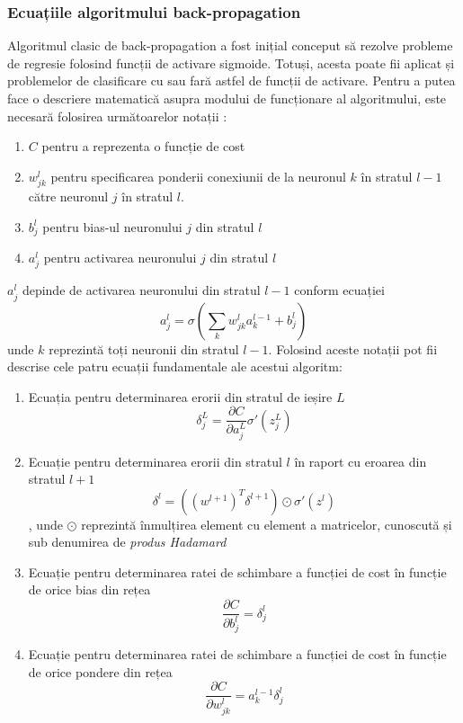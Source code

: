 \subsubsection*{Ecuațiile algoritmului back-propagation}
Algoritmul clasic de back-propagation a fost inițial conceput să rezolve probleme de regresie folosind funcții de activare sigmoide. Totuși, acesta poate fii aplicat și problemelor de clasificare cu sau fară astfel de funcții de activare. Pentru a putea face o descriere matematică asupra modului de funcționare al algoritmului, este necesară folosirea următoarelor notații \cite{neuralnetbook:2015}:
\begin{enumerate}
\item $C$ pentru a reprezenta o funcție de cost
\item $w_{jk}^l$ pentru specificarea ponderii conexiunii de la neuronul $k$ în stratul $l-1$ către neuronul $j$ în stratul $l$.
\item $b_j^l$ pentru bias-ul neuronului $j$ din stratul $l$
\item $a_j^l$ pentru activarea neuronului $j$ din stratul $l$
\end{enumerate}
$a_j^l$ depinde de activarea neuronului din stratul $l-1$ conform ecuației
\begin{equation}
a_j^l=\sigma(\sum_k w_{jk}^l a_k^{l-1} + b_j^l)
\end{equation}
unde $k$ reprezintă toți neuronii din stratul $l-1$. Folosind aceste notații pot fii descrise cele patru ecuații fundamentale ale acestui algoritm:
\begin{enumerate}
\item Ecuația pentru determinarea erorii din stratul de ieșire $L$
\begin{equation}
\delta_j^L=\frac{\partial C}{\partial a_j^L}\sigma'(z_j^L)
\label{eq:out-err}
\end{equation}
\item Ecuație pentru determinarea erorii din stratul $l$ în raport cu eroarea din stratul $l+1$
\begin{equation}
\delta^l = ((w^{l+1})^T \delta^{l+1}) \odot \sigma'(z^l)
\label{eq:back-prop-err}
\end{equation}
, unde $\odot$ reprezintă înmulțirea element cu element a matricelor, cunoscută și sub denumirea de \textit{produs Hadamard}
\item Ecuație pentru determinarea ratei de schimbare a funcției de cost în funcție de orice bias din rețea
\begin{equation}
\frac{\partial C}{\partial b^l_j} = \delta^l_j
\label{eq:cost-w}
\end{equation}
\item Ecuație pentru determinarea ratei de schimbare a funcției de cost în funcție de orice pondere din rețea
\begin{equation}
\frac{\partial C}{\partial w^l_{jk}} = a^{l-1}_k \delta^l_j
\label{eq:cost-b}
\end{equation}
\end{enumerate}

